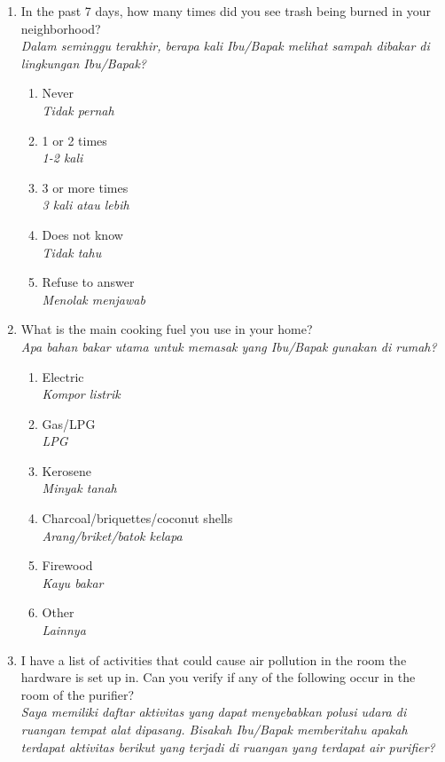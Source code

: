 \documentclass[reqno,12pt,notitlepage]{article}
\begin{document}
\begin{enumerate}
\begin{enumerate}
    \end{enumerate}
    \item In the past 7 days, how many times did you see trash being burned in your neighborhood? \\ \textit{Dalam seminggu terakhir, berapa kali Ibu/Bapak melihat sampah dibakar di lingkungan Ibu/Bapak?}
    \begin{enumerate}
        \item Never \\ \textit{Tidak pernah} 
        \item 1 or 2 times \\ \textit{1-2 kali}
        \item 3 or more times \\ \textit{3 kali atau lebih}
        \item Does not know \\ \textit{Tidak tahu}
        \item Refuse to answer \\ \textit{Menolak menjawab}
    \end{enumerate}
    \item What is the main cooking fuel you use in your home? \\ \textit{Apa bahan bakar utama untuk memasak yang Ibu/Bapak gunakan di rumah?}
    \begin{enumerate}
        \item Electric \\ \textit{Kompor listrik}
        \item Gas/LPG \\ \textit{LPG}
        \item Kerosene \\ \textit{Minyak tanah}
        \item Charcoal/briquettes/coconut shells \\ \textit{Arang/briket/batok kelapa}
        \item Firewood \\ \textit{Kayu bakar}
        \item Other \\ \textit{Lainnya}
    \end{enumerate}
    \item I have a list of activities that could cause air pollution in the room the hardware is set up in. Can you verify if any of the following occur in the room of the purifier? \\ \textit{Saya memiliki daftar aktivitas yang dapat menyebabkan polusi udara di ruangan tempat alat dipasang. Bisakah Ibu/Bapak memberitahu apakah terdapat aktivitas berikut yang terjadi di ruangan yang terdapat air purifier?}	

\end{enumerate}
\end{document}

